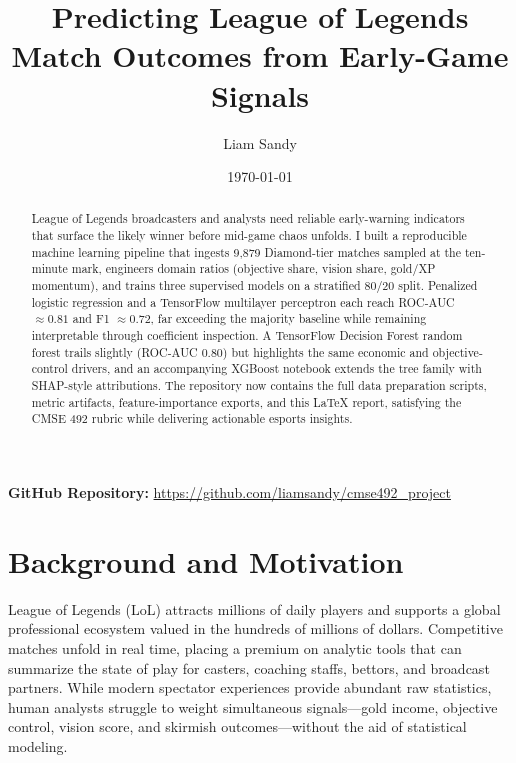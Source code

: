 \documentclass[aps,prl,preprint,groupedaddress]{revtex4-2}
\begin{document}
\title{Predicting League of Legends Match Outcomes from Early-Game Signals}

\author{Liam Sandy}

\date{\today}

\begin{abstract}
League of Legends broadcasters and analysts need reliable early-warning indicators that surface the likely winner before mid-game chaos unfolds. I built a reproducible machine learning pipeline that ingests 9,879 Diamond-tier matches sampled at the ten-minute mark, engineers domain ratios (objective share, vision share, gold/XP momentum), and trains three supervised models on a stratified 80/20 split. Penalized logistic regression and a TensorFlow multilayer perceptron each reach ROC-AUC $\approx 0.81$ and F1 $\approx 0.72$, far exceeding the majority baseline while remaining interpretable through coefficient inspection. A TensorFlow Decision Forest random forest trails slightly (ROC-AUC 0.80) but highlights the same economic and objective-control drivers, and an accompanying XGBoost notebook extends the tree family with SHAP-style attributions. The repository now contains the full data preparation scripts, metric artifacts, feature-importance exports, and this LaTeX report, satisfying the CMSE 492 rubric while delivering actionable esports insights.
\end{abstract}

\maketitle

\noindent\textbf{GitHub Repository:} \url{https://github.com/liamsandy/cmse492_project}

\section{Background and Motivation}
\label{sec:background}

League of Legends (LoL) attracts millions of daily players and supports a global professional ecosystem valued in the hundreds of millions of dollars. Competitive matches unfold in real time, placing a premium on analytic tools that can summarize the state of play for casters, coaching staffs, bettors, and broadcast partners. While modern spectator experiences provide abundant raw statistics, human analysts struggle to weight simultaneous signals---gold income, objective control, vision score, and skirmish outcomes---without the aid of statistical modeling.
\end{document}
